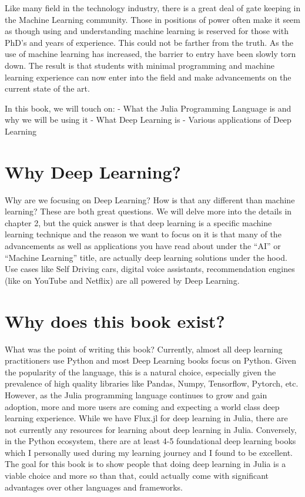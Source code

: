 \documentclass[
  notoc %
]{tufte-book}
\begin{document}
Like many field in the technology industry, there is a great deal of
gate keeping in the Machine Learning community. Those in positions of
power often make it seem as though using and understanding machine
learning is reserved for those with PhD's and years of experience. This
could not be farther from the truth. As the use of machine learning has
increased, the barrier to entry have been slowly torn down. The result
is that students with minimal programming and machine learning
experience can now enter into the field and make advancements on the
current state of the art.

In this book, we will touch on: - What the Julia Programming Language is
and why we will be using it - What Deep Learning is - Various
applications of Deep Learning

\hypertarget{sec:why_deep_learning}{%
\section{Why Deep Learning?}\label{sec:why_deep_learning}}

Why are we focusing on Deep Learning? How is that any different than
machine learning? These are both great questions. We will delve more
into the details in chapter 2, but the quick answer is that deep
learning is a specific machine learning technique and the reason we want
to focus on it is that many of the advancements as well as applications
you have read about under the ``AI'' or ``Machine Learning'' title, are
actually deep learning solutions under the hood. Use cases like Self
Driving cars, digital voice assistants, recommendation engines (like on
YouTube and Netflix) are all powered by Deep Learning.

\hypertarget{sec:book_motivation}{%
\section{Why does this book exist?}\label{sec:book_motivation}}

What was the point of writing this book? Currently, almost all deep
learning practitioners use Python and most Deep Learning books focus on
Python. Given the popularity of the language, this is a natural choice,
especially given the prevalence of high quality libraries like Pandas,
Numpy, Tensorflow, Pytorch, etc. However, as the Julia programming
language continues to grow and gain adoption, more and more users are
coming and expecting a world class deep learning experience. While we
have Flux.jl for deep learning in Julia, there are not currently any
resources for learning about deep learning in Julia. Conversely, in the
Python ecosystem, there are at least 4-5 foundational deep learning
books which I personally used during my learning journey and I found to
be excellent. The goal for this book is to show people that doing deep
learning in Julia is a viable choice and more so than that, could
actually come with significant advantages over other languages and
frameworks.
\end{document}
